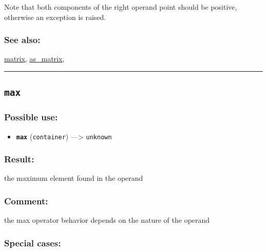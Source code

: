 \documentclass[]{book}
\providecommand{\tightlist}{%
  \setlength{\itemsep}{0pt}\setlength{\parskip}{0pt}}
\theoremstyle{definition}
\theoremstyle{definition}
\theoremstyle{definition}
\theoremstyle{remark}
\begin{document}
Note that both components of the right operand point should be positive,
otherwise an exception is raised.

\subsubsection{See also:}\label{see-also-133}

\href{operators-i-to-m.html\#matrix}{matrix},
\href{operators-a-to-a.html\#as_matrix}{as\_matrix},

\begin{center}\rule{0.5\linewidth}{\linethickness}\end{center}

\subsection{\texorpdfstring{\texttt{max}}{max}}\label{max}

\subsubsection{Possible use:}\label{possible-use-339}

\begin{itemize}
\tightlist
\item
  \textbf{\texttt{max}} (\texttt{container}) ---\textgreater{}
  \texttt{unknown}
\end{itemize}

\subsubsection{Result:}\label{result-328}

the maximum element found in the operand

\subsubsection{Comment:}\label{comment-65}

the max operator behavior depends on the nature of the operand

\subsubsection{Special cases:}\label{special-cases-93}
\end{document}
